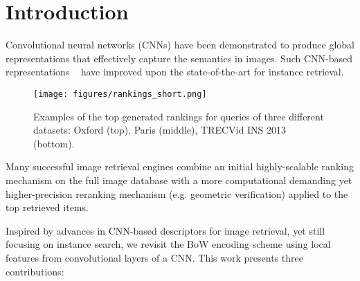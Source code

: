 \documentclass{sig-arxiv}
\begin{document}
\section{Introduction}\label{1_intro}%
Convolutional neural networks (CNNs) have been demonstrated to produce global representations that effectively capture the semantics in images. Such CNN-based representations ~\cite{babenko2015,neuralcodes,cnnofftheshelf,razavian2015,tolias2015,xie2015image} have improved upon the state-of-the-art for instance retrieval.

\begin{figure}
  \texttt{[image: figures/rankings\_short.png]}
  \caption{Examples of the top generated rankings for queries of three different datasets: Oxford (top), Paris (middle), TRECVid INS 2013 (bottom).}
  \label{fig:rankings}
\end{figure}%

Many successful image retrieval engines combine an initial highly-scalable ranking mechanism on the full image database with a more computational demanding yet higher-precision reranking mechanism (e.g. geometric verification) applied to the top retrieved items.


Inspired by advances in CNN-based descriptors for image retrieval, yet still focusing on instance search, we revisit the BoW encoding scheme using local features from convolutional layers of a CNN. 
This work presents three contributions: 
\end{document}
